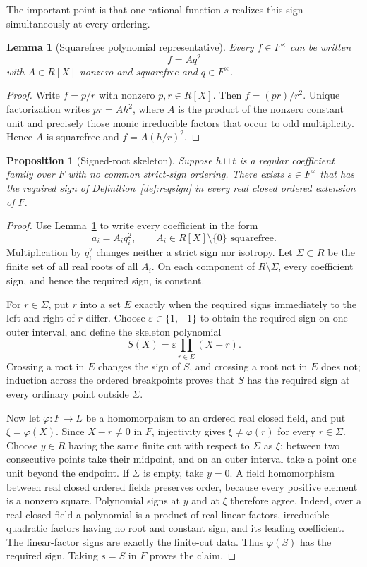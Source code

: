 \documentclass[uplatex,dvipdfmx]{jsarticle}
\newtheorem{proposition}[theorem]{Proposition}
\newtheorem{lemma}[theorem]{Lemma}
\theoremstyle{definition}
\theoremstyle{remark}
\begin{document}
The important point is that one rational function $s$ realizes this sign
simultaneously at every ordering.

\begin{lemma}[Squarefree polynomial representative]\label{lem:squarefree-normal}
Every $f\in F^\times$ can be written
\[
  f=Aq^2
\]
with $A\in R[X]$ nonzero and squarefree and $q\in F^\times$.
\end{lemma}
\begin{proof}
Write $f=p/r$ with nonzero $p,r\in R[X]$.  Then
$f=(pr)/r^2$.  Unique factorization writes
$pr=A h^2$, where $A$ is the product of the nonzero constant unit and
precisely those monic irreducible factors that occur to odd multiplicity.
Hence $A$ is squarefree and
$f=A(h/r)^2$.
\end{proof}

\begin{proposition}[Signed-root skeleton]\label{prop:skeleton}
Suppose $h\sqcup t$ is a regular coefficient family over $F$ with no
common strict-sign ordering.  There exists $s\in F^\times$ that has the
required sign of Definition~\ref{def:reqsign} in every real closed ordered
extension of $F$.
\end{proposition}
\begin{proof}
Use Lemma~\ref{lem:squarefree-normal} to write every coefficient in the form
\[
  a_i=A_i q_i^2,
  \qquad A_i\in R[X]\setminus\{0\}\text{ squarefree}.
\]
Multiplication by $q_i^2$ changes neither a strict sign nor isotropy.  Let
$\Sigma\subset R$ be the finite set of all real roots of all $A_i$.
On each component of $R\setminus\Sigma$, every coefficient sign, and hence
the required sign, is constant.

For $r\in\Sigma$, put $r$ into a set $E$ exactly when the required signs
immediately to the left and right of $r$ differ.  Choose
$\varepsilon\in\{1,-1\}$ to obtain the required sign on one outer interval,
and define the skeleton polynomial
\[
  S(X)=\varepsilon\prod_{r\in E}(X-r).
\]
Crossing a root in $E$ changes the sign of $S$, and crossing a root not in
$E$ does not; induction across the ordered breakpoints proves that $S$ has
the required sign at every ordinary point outside $\Sigma$.

Now let $\varphi:F\to L$ be a homomorphism to an ordered real closed field,
and put $\xi=\varphi(X)$.  Since $X-r\ne0$ in $F$, injectivity gives
$\xi\ne\varphi(r)$ for every $r\in\Sigma$.  Choose $y\in R$ having the
same finite cut with respect to $\Sigma$ as $\xi$: between two consecutive
points take their midpoint, and on an outer interval take a point one unit
beyond the endpoint.  If $\Sigma$ is empty, take $y=0$.  A field
homomorphism between real closed ordered fields
preserves order, because every positive element is a nonzero square.
Polynomial signs at $y$ and at $\xi$ therefore agree.  Indeed, over a real
closed field a polynomial is a product of real linear factors, irreducible
quadratic factors having no root and constant sign, and its leading
coefficient.  The linear-factor signs are exactly the finite-cut data.
Thus $\varphi(S)$ has the required sign.  Taking $s=S$ in $F$ proves the
claim.
\end{proof}
\end{document}
